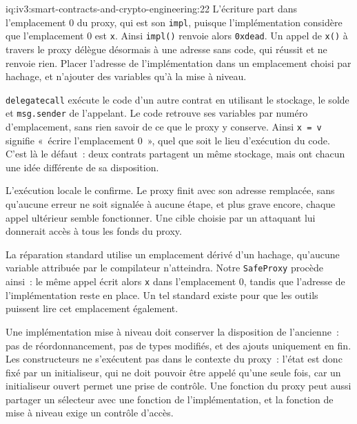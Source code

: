 \begin{solution}{iq:iv3:smart-contracts-and-crypto-engineering:22}
L'écriture part dans l'emplacement 0 du proxy, qui est son \texttt{impl}, puisque l'implémentation considère que l'emplacement 0 est \texttt{x}. Ainsi \texttt{impl()} renvoie alors \texttt{0xdead}. Un appel de \texttt{x()} à travers le proxy délègue désormais à une adresse sans code, qui réussit et ne renvoie rien. Placer l'adresse de l'implémentation dans un emplacement choisi par hachage, et n'ajouter des variables qu'à la mise à niveau.

\texttt{delegatecall} exécute le code d'un autre contrat en utilisant le stockage, le solde et \texttt{msg.sender} de l'appelant. Le code retrouve ses variables par numéro d'emplacement, sans rien savoir de ce que le proxy y conserve. Ainsi \texttt{x = v} signifie «~écrire l'emplacement 0~», quel que soit le lieu d'exécution du code. C'est là le défaut~: deux contrats partagent un même stockage, mais ont chacun une idée différente de sa disposition.

L'exécution locale le confirme. Le proxy finit avec son adresse remplacée, sans qu'aucune erreur ne soit signalée à aucune étape, et plus grave encore, chaque appel ultérieur semble fonctionner. Une cible choisie par un attaquant lui donnerait accès à tous les fonds du proxy.

La réparation standard utilise un emplacement dérivé d'un hachage, qu'aucune variable attribuée par le compilateur n'atteindra. Notre \texttt{SafeProxy} procède ainsi~: le même appel écrit alors \texttt{x} dans l'emplacement 0, tandis que l'adresse de l'implémentation reste en place. Un tel standard existe pour que les outils puissent lire cet emplacement également.

Une implémentation mise à niveau doit conserver la disposition de l'ancienne~: pas de réordonnancement, pas de types modifiés, et des ajouts uniquement en fin. Les constructeurs ne s'exécutent pas dans le contexte du proxy~: l'état est donc fixé par un initialiseur, qui ne doit pouvoir être appelé qu'une seule fois, car un initialiseur ouvert permet une prise de contrôle. Une fonction du proxy peut aussi partager un sélecteur avec une fonction de l'implémentation, et la fonction de mise à niveau exige un contrôle d'accès.

\end{solution}

